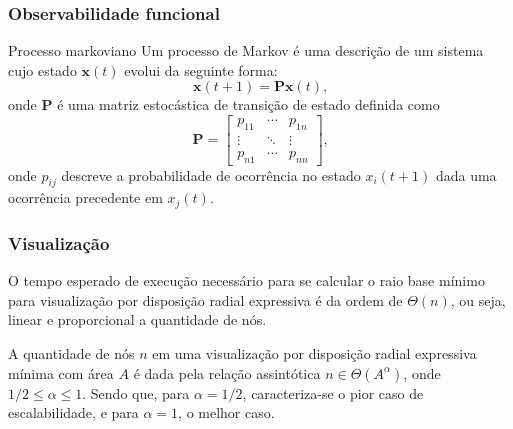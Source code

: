 \documentclass[10pt]{beamer}
\begin{document}
\begin{frame}
    \frametitle{Observabilidade funcional}

\begin{block}{Processo markoviano}
Um processo de Markov é uma descrição de um sistema cujo estado
$\mathbf{x}(t)$ evolui da seguinte forma:
\begin{equation*}
    \mathbf{x}(t+1) = \mathbf{P} \mathbf{x}(t)\text{,}
\end{equation*}
onde $\mathbf{P}$ é uma matriz estocástica de transição de estado definida
como
\begin{equation*}
\mathbf{P} =
\begin{bmatrix}
    p_{11} & \dotsb & p_{1n} \\
    \vdots & \ddots & \vdots \\
    p_{n1} & \dotsb & p_{nn} 
\end{bmatrix}\text{,}
\end{equation*}
onde $p_{ij}$ descreve a probabilidade de ocorrência no estado $x_i(t+1)$
dada uma ocorrência precedente em $x_j(t)$.
\end{block}

\end{frame}

\begin{frame}
    \frametitle{Visualização}

\begin{teorema}
O tempo esperado de execução necessário para se calcular o raio base mínimo
para visualização por disposição radial expressiva é da ordem de $\Theta(n)$,
ou seja, linear e proporcional a quantidade de nós.
\end{teorema}

\vfill

\begin{teorema}
A quantidade de nós $n$ em uma visualização por disposição radial expressiva
mínima com área $A$ é dada pela relação assintótica $n\in\Theta(A^\alpha)$,
onde $1/2 \leq \alpha \leq 1$.
Sendo que, para $\alpha=1/2$, caracteriza-se o pior caso de escalabilidade, e
para $\alpha=1$, o melhor caso.
\end{teorema}

\end{frame}
\end{document}
